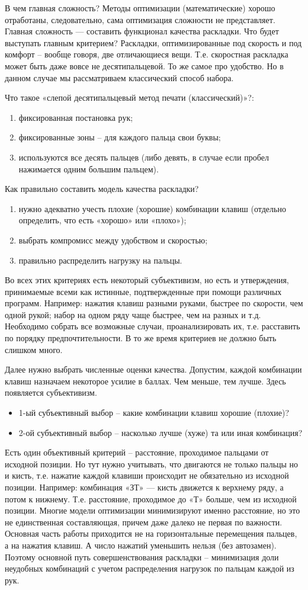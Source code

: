 \documentclass[14pt]{article} %
\begin{document}
В чем главная сложность?
Методы оптимизации (математические) хорошо отработаны, следовательно, сама оптимизация сложности не представляет. Главная сложность — составить функционал качества раскладки. 
Что будет выступать главным критерием?
Раскладки, оптимизированные под скорость и под комфорт – вообще говоря, две отличающиеся вещи. Т.е. скоростная раскладка может быть даже вовсе не десятипальцевой. То же самое про удобство. Но в данном случае мы рассматриваем классический способ набора.

Что такое «слепой десятипальцевый метод печати (классический)»?:
\begin{enumerate}
\item
фиксированная постановка рук;
\item
фиксированные зоны – для каждого пальца свои буквы;
\item
используются все десять пальцев (либо девять, в случае если пробел нажимается одним большим пальцем).
\end{enumerate}
Как правильно составить модель качества раскладки?
\begin{enumerate}
\item
нужно адекватно учесть плохие (хорошие) комбинации клавиш (отдельно определить, что есть «хорошо» или «плохо»);
\item
выбрать компромисс между удобством и скоростью;
\item
правильно распределить нагрузку на пальцы.
\end{enumerate}
Во всех этих критериях есть некоторый субъективизм, но есть и утверждения, принимаемые всеми как истинные, подтвержденные при помощи различных программ.
Например: нажатия клавиш разными руками, быстрее по скорости, чем одной рукой; набор на одном ряду чаще быстрее, чем на разных и т.д.
Необходимо собрать все возможные случаи, проанализировать их, т.е. расставить по порядку предпочтительности. В то же время критериев не должно быть слишком много.

Далее нужно выбрать численные оценки качества. Допустим, каждой комбинации клавиш назначаем некоторое усилие в баллах. Чем меньше, тем лучше. Здесь появляется субъективизм.
\begin{itemize}
\item
1-ый субъективный выбор – какие комбинации клавиш хорошие (плохие)?
\item
2-ой субъективный выбор – насколько лучше (хуже) та или иная комбинация?
\end{itemize}
Есть один объективный критерий – расстояние, проходимое пальцами от исходной позиции.
Но тут нужно учитывать, что двигаются не только пальцы но и кисть, т.е. нажатие каждой клавиши происходит не обязательно из исходной позиции.
Например: комбинация «ЗТ» — кисть движется к верхнему ряду, а потом к нижнему. Т.е. расстояние, проходимое до «Т» больше, чем из исходной позиции.
Многие модели оптимизации минимизируют именно расстояние, но это не единственная составляющая, причем даже далеко не первая по важности. Основная часть работы приходится не на горизонтальные перемещения пальцев, а на нажатия клавиш. А число нажатий уменьшить нельзя (без автозамен).
Поэтому основной путь совершенствования раскладки – минимизация доли неудобных комбинаций с учетом распределения нагрузок по пальцам каждой из рук.
\end{document}
